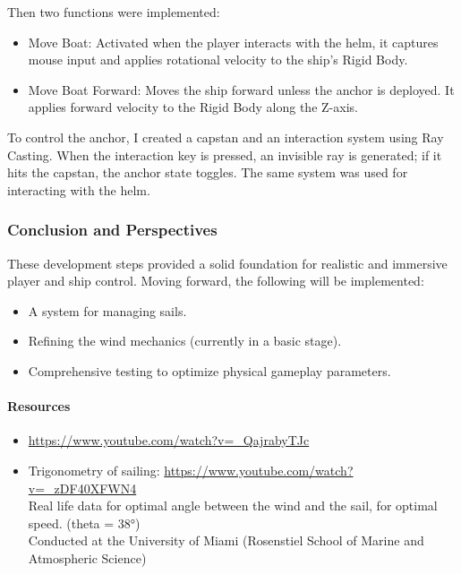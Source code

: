 \documentclass{article}
\begin{document}
Then two functions were implemented:
\begin{itemize}
    \item Move Boat: Activated when the player interacts with the helm, it captures mouse input and applies rotational velocity to the ship's Rigid Body.
    \item Move Boat Forward: Moves the ship forward unless the anchor is deployed. It applies forward velocity to the Rigid Body along the Z-axis.
\end{itemize}

To control the anchor, I created a capstan and an interaction system using Ray Casting. When the interaction key is pressed, an invisible ray is generated; if it hits the capstan, the anchor state toggles. The same system was used for interacting with the helm.

\subsubsection{Conclusion and Perspectives}\hfill

These development steps provided a solid foundation for realistic and immersive player and ship control. Moving forward, the following will be implemented:
\begin{itemize}
    \item A system for managing sails.
    \item Refining the wind mechanics (currently in a basic stage).
    \item Comprehensive testing to optimize physical gameplay parameters.
\end{itemize}

\paragraph{Resources}\hfill

\begin{itemize}
    \item \url{https://www.youtube.com/watch?v=_QajrabyTJc}
    \item Trigonometry of sailing: \url{https://www.youtube.com/watch?v=_zDF40XFWN4}\\
    Real life data for optimal angle between the wind and the sail, for optimal speed. (theta = 38°)\\
    Conducted at the University of Miami (Rosenstiel School of Marine and Atmospheric Science)
\end{itemize}
\end{document}
